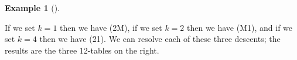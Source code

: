 \documentclass[numbers=enddot,12pt,final,onecolumn,notitlepage]{scrartcl}%
\theoremstyle{definition}
\newtheorem{exmp}[theo]{Example}
\newenvironment{example}[1][]
{\begin{exmp}[#1]\begin{leftbar}}
{\end{leftbar}\end{exmp}}
\begin{document}
\begin{example}
If we set $k=1$ then we have (2M), if we set $k=2$ then we have (M1), and if we set $k=4$ then we have (21). We can resolve each of these three descents; the results are the three 12-tables on the right.


\begin{comment}
 

and resolving the descent $k=1$
in $P$
gives us the 12-table $\operatorname*{res}\nolimits_{1}P$, which is
\[
\ytableausetup{notabloids}
\begin{ytableau}
\none& \none& 1 & 2 & 1 \\
\none& 2 & 1 & 2 \\
1 & 2 & 1 \\
2 & 2 & 1 \\
2
\end{ytableau}%
\]

If we instead set $k=2$, then we have (M1), and resolving the descent
$k=2$ in $P$
gives us the 12-table $\operatorname*{res}\nolimits_{2}P$, which is
\[
\ytableausetup{notabloids}
\begin{ytableau}
\none& \none& 1 & 2 & 1 \\
\none& 1 & 1 & 2 \\
2 & 1 & 1 \\
2 & 1 & 2 \\
2
\end{ytableau}%
\]

If we instead set $k=4$, then we have (21), and resolving the descent
$k=4$ in $P$
gives us the 12-table $\operatorname*{res}\nolimits_{4}P$, which is
\[
\ytableausetup{notabloids}
\begin{ytableau}
\none& \none& 1 & 1 & 2 \\
\none& 1 & 1 & 1 \\
2 & 1 & 1 \\
2 & 2 & 1 \\
2
\end{ytableau}%
\]


\end{comment}
\end{example}
\end{document}
